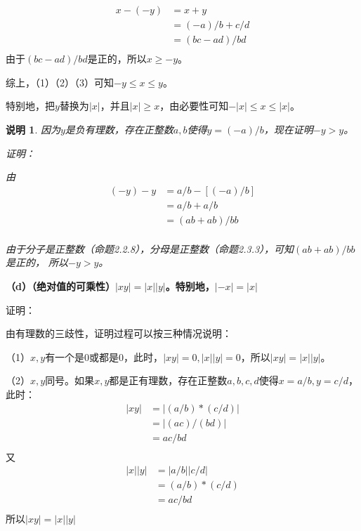 \documentclass{article}
\theoremstyle{mystyle}
\newtheorem*{zremark}{说明}
\begin{document}
\begin{align*}
  x - (-y) & = x + y        \\
           & = (-a)/b + c/d \\
           & = (bc - ad)/bd \\
\end{align*}
由于$(bc - ad)/bd$是正的，所以$x \geq -y$。

综上，（1）（2）（3）可知$-y \leq x \leq y$。

特别地，把$y$替换为$|x|$，并且$|x| \geq x$，由必要性可知$-|x| \leq x \leq |x|$。

\begin{zgraytheorem}
  \begin{zremark}
    因为$y$是负有理数，存在正整数$a,b$使得$y = (-a)/b$，现在证明$-y > y$。

    证明：

    由
    \begin{align*}
      (-y) - y & = a/b - [(-a)/b] \\
               & = a/b + a/b      \\
               & = (ab + ab)/bb   \\
    \end{align*}

    由于分子是正整数（命题2.2.8），分母是正整数（命题2.3.3），可知$(ab + ab)/bb$是正的，
    所以$-y > y$。
  \end{zremark}
\end{zgraytheorem}

\textbf{（d）（绝对值的可乘性）$|xy|=|x||y|$。特别地，$|-x|=|x|$}

证明：

由有理数的三歧性，证明过程可以按三种情况说明：

（1）$x,y$有一个是0或都是0，此时，$|xy|=0,|x||y|=0$，所以$|xy|=|x||y|$。

（2）$x,y$同号。如果$x,y$都是正有理数，存在正整数$a,b,c,d$使得$x=a/b,y=c/d$，此时：
\begin{align*}
  |xy| & = |(a/b) * (c/d)| \\
       & = |(ac)/(bd)|     \\
       & = ac/bd           \\
\end{align*}
又
\begin{align*}
  |x||y| & = |a/b||c/d|    \\
         & = (a/b) * (c/d) \\
         & = ac/bd         \\
\end{align*}
所以$|xy|=|x||y|$
\end{document}
